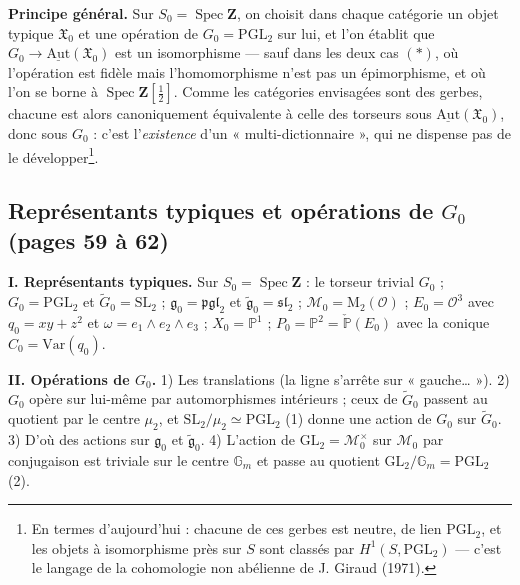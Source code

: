 \documentclass[11pt,a4paper]{article}
\begin{document}
\textbf{Principe général.} Sur $S_0 = \operatorname{Spec}\mathbf{Z}$, on choisit dans chaque
catégorie un objet typique $\mathfrak{X}_0$ et une opération de
$G_0 = \mathrm{PGL}_2$ sur lui, et l'on établit que $G_0 \to
\underline{\mathrm{Aut}}(\mathfrak{X}_0)$ est un isomorphisme — sauf dans les deux cas $(*)$,
où l'opération est fidèle mais l'homomorphisme n'est pas un épimorphisme, et
où l'on se borne à $\operatorname{Spec}\mathbf{Z}[\tfrac{1}{2}]$. Comme les catégories
envisagées sont des gerbes, chacune est alors canoniquement équivalente à celle
des torseurs sous $\underline{\mathrm{Aut}}(\mathfrak{X}_0)$, donc sous $G_0$ : c'est
l'\emph{existence} d'un « multi-dictionnaire », qui ne dispense pas de le
développer\footnote{En termes d'aujourd'hui : chacune de ces gerbes est
neutre, de lien $\mathrm{PGL}_2$, et les objets à isomorphisme près sur $S$ sont
classés par $H^1(S, \mathrm{PGL}_2)$ — c'est le langage de la cohomologie non
abélienne de J. Giraud (1971).}.

\subsection*{Représentants typiques et opérations de $G_0$ (pages 59 à 62)}

\textbf{I. Représentants typiques.} Sur $S_0 = \operatorname{Spec}\mathbf{Z}$ : le torseur
trivial $G_0$ ; $G_0 = \mathrm{PGL}_2$ et $\widetilde{G}_0 = \mathrm{SL}_2$ ;
$\mathfrak{g}_0 = \mathfrak{pgl}_2$ et $\widetilde{\mathfrak{g}}_0 = \mathfrak{sl}_2$ ;
$\mathcal{M}_0 = \mathrm{M}_2(\mathcal{O})$ ; $E_0 = \mathcal{O}^3$ avec $q_0 = xy + z^2$ et
$\omega = e_1 \wedge e_2 \wedge e_3$ ; $X_0 = \mathbb{P}^1$ ; $P_0 = \mathbb{P}^2 =
\check{\mathbb{P}}(E_0)$ avec la conique $C_0 = \mathrm{Var}(q_0)$.

\textbf{II. Opérations de $G_0$.} 1) Les translations (la ligne s'arrête sur
« gauche… »). 2) $G_0$ opère sur lui-même par automorphismes intérieurs ; ceux de
$\widetilde{G}_0$ passent au quotient par le centre $\mu_2$, et
$\mathrm{SL}_2/\mu_2 \simeq \mathrm{PGL}_2$ (1) donne une action de $G_0$ sur
$\widetilde{G}_0$. 3) D'où des actions sur $\mathfrak{g}_0$ et $\widetilde{\mathfrak{g}}_0$.
4) L'action de $\mathrm{GL}_2 = \mathcal{M}_0^{\times}$ sur $\mathcal{M}_0$ par conjugaison est
triviale sur le centre $\mathbb{G}_m$ et passe au quotient
$\mathrm{GL}_2/\mathbb{G}_m = \mathrm{PGL}_2$ (2).
\end{document}
